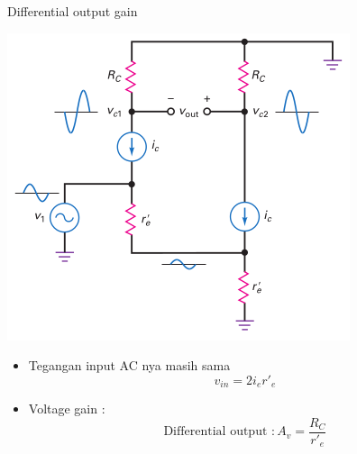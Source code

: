 \documentclass[aspectratio=169]{beamer}
\begin{document}
\begin{frame}{Differential output gain}
	\begin{multicols}{2}
		\begin{center}
			\includegraphics[height=0.7\textheight]{gambar/01.noninverting_input_and_differential_output}
		\end{center}
		\columnbreak
		\begin{itemize}
			\item Tegangan input AC nya masih sama
			\[ v_{in} = 2 i_e r'_e \]
			\item Voltage gain : 
			\begin{equation}
				\text{Differential output }: A_v = \frac{R_C}{r'_e}
			\end{equation}
		\end{itemize}
	\end{multicols}
\end{frame}
\end{document}
